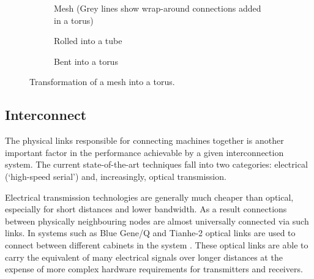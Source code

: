 				\begin{figure}
					\begin{subfigure}[t]{\textwidth}
						\center
						
						\caption{Mesh (Grey lines show wrap-around connections added in a
						torus)}
						\label{fig:torus-flat}
					\end{subfigure}
					
					\vspace{1em}
					
					\begin{subfigure}[t]{\textwidth}
						\center
						
						\caption{Rolled into a tube}
						\label{fig:torus-pipe}
					\end{subfigure}
					
					\vspace{1em}
					
					\begin{subfigure}[t]{\textwidth}
						\center
						
						\caption{Bent into a torus}
						\label{fig:torus-3D}
					\end{subfigure}
					
					\caption{Transformation of a mesh into a torus.}
					\label{fig:forming-a-torus}
				\end{figure}
		
		\subsection{Interconnect}
			
			
			The physical links responsible for connecting machines together is another
			important factor in the performance achievable by a given interconnection
			system. The current state-of-the-art techniques fall into two categories:
			electrical (`high-speed serial') and, increasingly, optical transmission.
			
			Electrical transmission technologies are generally much cheaper than
			optical, especially for short distances and lower bandwidth. As a result
			connections between physically neighbouring nodes are almost universally
			connected via such links. In systems such as Blue Gene/Q and Tianhe-2
			optical links are used to connect between different cabinets in the system
			\cite{dongarra13,prickett10}. These optical links are able to carry the
			equivalent of many electrical signals over longer distances at the expense
			of more complex hardware requirements for transmitters and receivers.
			
